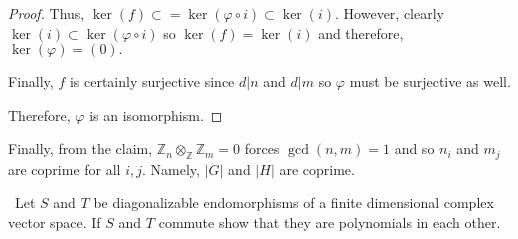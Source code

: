 \documentclass[12pt]{AlgebraQual}
\begin{document}
\begin{solution}
\begin{claim}
\begin{proof}
Thus, $\ker(f)\subset=\ker(\varphi\circ i)\subset \ker(i)$. However, clearly $\ker(i)\subset\ker(\varphi\circ i)$ so $\ker(f)=\ker(i)$ and therefore, $\ker(\varphi)=(0).$

Finally, $f$ is certainly surjective since $d|n$ and $d|m$ so $\varphi$ must be surjective as well.

Therefore, $\varphi$ is an isomorphism.
\end{proof}
\end{claim}
\vspace{0.1cm}

Finally, from the claim, $\mathbb{Z}_n\otimes_\mathbb{Z}\mathbb{Z}_m=0$ forces $\gcd(n,m)=1$ and so $n_i$ and $m_j$ are coprime for all $i,j$. Namely, $|G|$ and $|H|$ are coprime.

\end{solution}
\newpage

\begin{problem} $\,$
Let $S$ and $T$ be diagonalizable endomorphisms of a finite dimensional complex vector space. If $S$ and $T$ commute show that they are polynomials in each other.
\end{problem}
\end{document}
